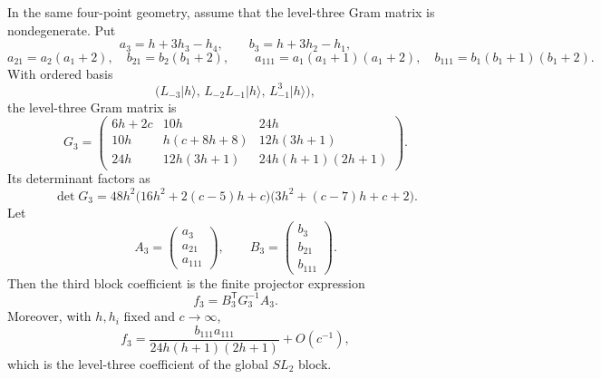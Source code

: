 \begin{lemma}
\label{lem:liouville-virasoro-block-level-three}
In the same four-point geometry, assume that the level-three Gram matrix is
nondegenerate.  Put
\[
  a_3=h+3h_3-h_4,\qquad b_3=h+3h_2-h_1,
\]
\[
  a_{21}=a_2(a_1+2),\quad b_{21}=b_2(b_1+2),
  \qquad
  a_{111}=a_1(a_1+1)(a_1+2),\quad
  b_{111}=b_1(b_1+1)(b_1+2).
\]
With ordered basis
\[
  \bigl(
    L_{-3}|h\rangle,\,
    L_{-2}L_{-1}|h\rangle,\,
    L_{-1}^3|h\rangle
  \bigr),
\]
the level-three Gram matrix is
\begin{equation}
  G_3=
  \begin{pmatrix}
    6h+2c & 10h & 24h\\
    10h & h(c+8h+8) & 12h(3h+1)\\
    24h & 12h(3h+1) & 24h(h+1)(2h+1)
  \end{pmatrix}.
  \label{eq:liouville-level-three-gram-matrix}
\end{equation}
Its determinant factors as
\begin{equation}
  \det G_3
  =
  48h^2
  \bigl(16h^2+2(c-5)h+c\bigr)
  \bigl(3h^2+(c-7)h+c+2\bigr).
  \label{eq:liouville-level-three-gram-determinant}
\end{equation}
Let
\[
  A_3=\begin{pmatrix}a_3\\ a_{21}\\ a_{111}\end{pmatrix},
  \qquad
  B_3=\begin{pmatrix}b_3\\ b_{21}\\ b_{111}\end{pmatrix}.
\]
Then the third block coefficient is the finite projector expression
\begin{equation}
  f_3=B_3^{\mathsf T}G_3^{-1}A_3.
  \label{eq:liouville-virasoro-block-level-three}
\end{equation}
Moreover, with \(h,h_i\) fixed and \(c\to\infty\),
\begin{equation}
  f_3
  =
  \frac{b_{111}a_{111}}{24h(h+1)(2h+1)}
  +O(c^{-1}),
  \label{eq:liouville-level-three-global-limit}
\end{equation}
which is the level-three coefficient of the global \(SL_2\) block.
\end{lemma}

